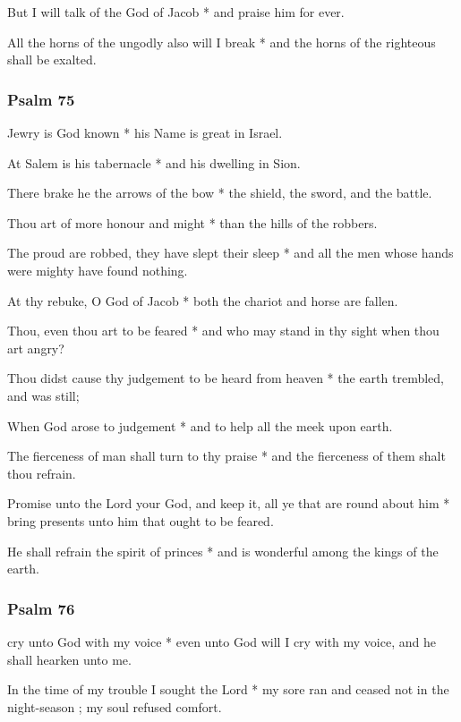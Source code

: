 But I will talk of the God of Jacob * and praise him for ever.

All the horns of the ungodly also will I break * and the horns of the righteous shall be exalted.

\subsubsection{Psalm 75}


 Jewry is God known * his Name is great in Israel.

At Salem is his tabernacle * and his dwelling in Sion.

There brake he the arrows of the bow * the shield, the sword, and the battle.

Thou art of more honour and might * than the hills of the robbers.

The proud are robbed, they have slept their sleep * and all the men whose hands were mighty have found nothing.

At thy rebuke, O God of Jacob * both the chariot and horse are fallen.

Thou, even thou art to be feared * and who may stand in thy sight when thou art angry?

Thou didst cause thy judgement to be heard from heaven * the earth trembled, and was still;

When God arose to judgement * and to help all the meek upon earth.

The fierceness of man shall turn to thy praise * and the fierceness of them shalt thou refrain.

Promise unto the Lord your God, and keep it, all ye that are round about him * bring presents unto him that ought to be feared.

He shall refrain the spirit of princes * and is wonderful among the kings of the earth.

\subsubsection{Psalm 76}


 cry unto God with my voice * even unto God will I cry with my voice, and he shall hearken unto me.

In the time of my trouble I sought the Lord * my sore ran and ceased not in the night-season ; my soul refused comfort.

